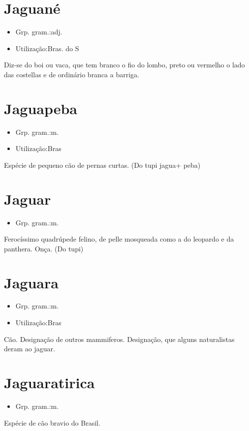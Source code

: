 \documentclass{article}
\begin{document}
\section{Jaguané}
\begin{itemize}
\item {Grp. gram.:adj.}
\end{itemize}
\begin{itemize}
\item {Utilização:Bras. do S}
\end{itemize}
Diz-se do boi ou vaca, que tem branco o fio do lombo, preto ou vermelho o lado das costellas e de ordinário branca a barriga.
\section{Jaguapeba}
\begin{itemize}
\item {Grp. gram.:m.}
\end{itemize}
\begin{itemize}
\item {Utilização:Bras}
\end{itemize}
Espécie de pequeno cão de pernas curtas.
(Do tupi \textunderscore jagua\textunderscore  + \textunderscore peba\textunderscore )
\section{Jaguar}
\begin{itemize}
\item {Grp. gram.:m.}
\end{itemize}
Ferocíssimo quadrúpede felino, de pelle mosqueada como a do leopardo e da panthera.
Onça.
(Do tupi)
\section{Jaguara}
\begin{itemize}
\item {Grp. gram.:m.}
\end{itemize}
\begin{itemize}
\item {Utilização:Bras}
\end{itemize}
Cão.
Designação de outros mammiferos.
Designação, que alguns naturalistas deram ao jaguar.
\section{Jaguaratirica}
\begin{itemize}
\item {Grp. gram.:m.}
\end{itemize}
Espécie de cão bravio do Brasil.
\end{document}
